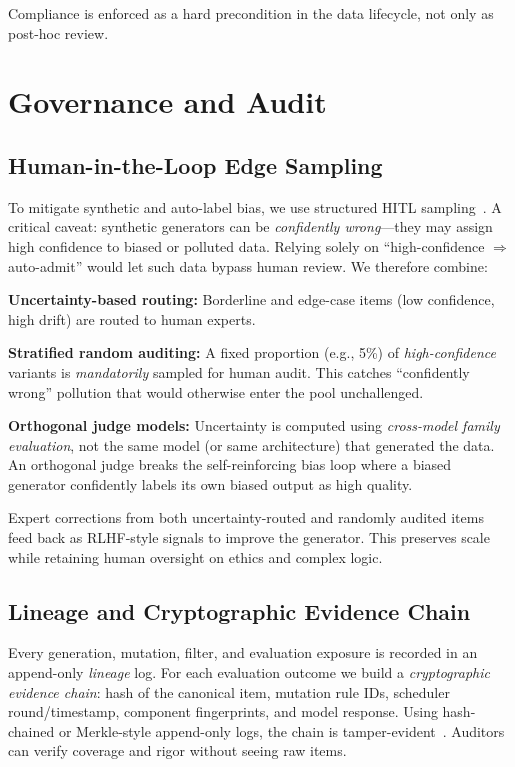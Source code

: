 \documentclass[letterpaper,twocolumn,10pt]{article}
\begin{document}
Compliance is enforced as a hard precondition in the data lifecycle, not only as post-hoc review.

\section{Governance and Audit}
\label{sec:governance}

\subsection{Human-in-the-Loop Edge Sampling}

To mitigate synthetic and auto-label bias, we use structured HITL sampling~\cite{hitl-toloka,hitl-comet}. A critical caveat: synthetic generators can be \emph{confidently wrong}---they may assign high confidence to biased or polluted data. Relying solely on ``high-confidence $\Rightarrow$ auto-admit'' would let such data bypass human review. We therefore combine:

\textbf{Uncertainty-based routing:} Borderline and edge-case items (low confidence, high drift) are routed to human experts.

\textbf{Stratified random auditing:} A fixed proportion (e.g., 5\%) of \emph{high-confidence} variants is \emph{mandatorily} sampled for human audit. This catches ``confidently wrong'' pollution that would otherwise enter the pool unchallenged.

\textbf{Orthogonal judge models:} Uncertainty is computed using \emph{cross-model family evaluation}, not the same model (or same architecture) that generated the data. An orthogonal judge breaks the self-reinforcing bias loop where a biased generator confidently labels its own biased output as high quality.

Expert corrections from both uncertainty-routed and randomly audited items feed back as RLHF-style signals to improve the generator. This preserves scale while retaining human oversight on ethics and complex logic.

\subsection{Lineage and Cryptographic Evidence Chain}

Every generation, mutation, filter, and evaluation exposure is recorded in an append-only \emph{lineage} log. For each evaluation outcome we build a \emph{cryptographic evidence chain}: hash of the canonical item, mutation rule IDs, scheduler round/timestamp, component fingerprints, and model response. Using hash-chained or Merkle-style append-only logs, the chain is tamper-evident~\cite{sbom-enisa,federated-lineage}. Auditors can verify coverage and rigor without seeing raw items.
\end{document}
